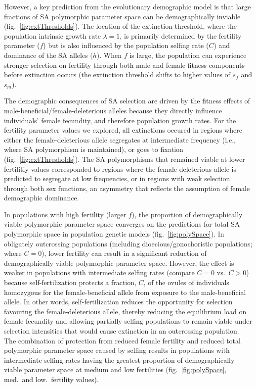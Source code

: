 \documentclass[11pt]{article}
\begin{document}
However, a key prediction from the evolutionary demographic model is that large fractions of SA polymorphic parameter space can be demographically inviable (fig.~\ref{fig:extThresholds}). The location of the extinction threshold, where the population intrinsic growth rate $\lambda = 1$, is primarily determined by the fertility parameter ($f$) but is also influenced by the population selfing rate ($C$) and dominance of the SA alleles ($h$). When $f$ is large, the population can experience stronger selection on fertility through both male and female fitness components before extinction occurs (the extinction threshold shifts to higher values of $s_f$ and $s_m$). 

The demographic consequences of SA selection are driven by the fitness effects of male-beneficial/female-deleterious alleles because they directly influence individuals' female fecundity, and therefore population growth rates. For the fertility parameter values we explored, all extinctions occured in regions where either the female-deleterious allele segregates at intermediate frequency (i.e., where SA polymorphism is maintained), or goes to fixation (fig.~\ref{fig:extThresholds}). The SA polymorphisms that remained viable at lower fertilitiy values corresponded to regions where the female-deleterious allele is predicted to segregate at low frequencies, or in regions with weak selection through both sex functions, an asymmetry that reflects the assumption of female demographic dominance.

In populations with high fertility (larger $f$), the proportion of demographically viable polymorphic parameter space converges on the predictions for total SA polymorphic space in population genetic models (fig.~\ref{fig:polySpace}). In obligately outcrossing populations (including dioecious/gonochoristic populations; where $C = 0$), lower fertility can result in a significant reduction of demographically viable polymorphic parameter space. However, the effect is weaker in populations with intermediate selfing rates (compare $C=0$ vs.~$C > 0$) because self-fertilization protects a fraction, $C$, of the ovules of individuals homozygous for the female-beneficial allele from exposure to the male-beneficial allele. In other words, self-fertilization reduces the opportunity for selection favouring the female-deleterious allele, thereby reducing the equilibrium load on female fecundity and allowing partially selfing populations to remain viable under selection intensities that would cause extinction in an outcrossing population. The combination of protection from reduced female fertility and reduced total polymorphic parameter space caused by selfing results in populations with intermediate selfing rates having the greatest proportion of demographically viable parameter space at medium and low fertilities (fig.~\ref{fig:polySpace}, med.~and low.~fertility values).
\end{document}
